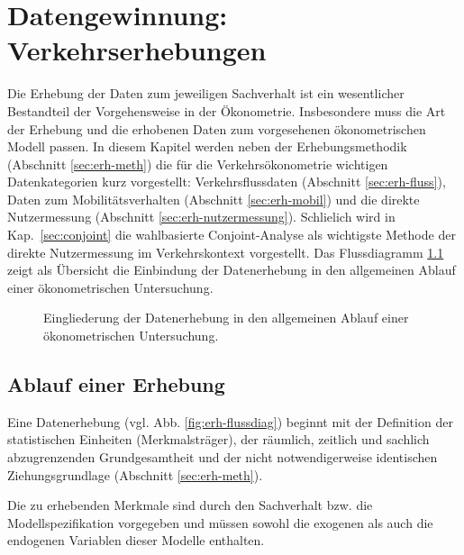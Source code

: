 


\chapter{\label{sec:erh}Datengewinnung: Verkehrserhebungen}

Die Erhebung der Daten zum jeweiligen Sachverhalt ist ein wesentlicher
Bestandteil der Vorgehensweise in der \"Okonometrie. Insbesondere muss die Art
der Erhebung und die erhobenen Daten zum vorgesehenen
\"okonometrischen Modell 
passen. In diesem Kapitel werden neben der Erhebungsmethodik 
(Abschnitt \ref{sec:erh-meth}) die f\"ur die Verkehrs\"okonometrie
wichtigen  Datenkategorien
kurz vorgestellt: Verkehrsflussdaten (Abschnitt
\ref{sec:erh-fluss}), Daten zum Mobilit\"atsverhalten
(Abschnitt \ref{sec:erh-mobil}) und die direkte Nutzermessung
(Abschnitt \ref{sec:erh-nutzermessung}). Schlie\3lich wird in
Kap.~\ref{sec:conjoint} die wahlbasierte Conjoint-Analyse als
wichtigste Methode der direkte Nutzermessung im Verkehrskontext vorgestellt. 
Das Flussdiagramm \ref{fig:flussdiag-erhebung} zeigt als \"Ubersicht
die Einbindung der 
Datenerhebung in den allgemeinen Ablauf einer \"okonometrischen
Untersuchung.

\begin{figure}
\caption{\label{fig:flussdiag-erhebung}Eingliederung der Datenerhebung
in den allgemeinen Ablauf einer \"okonometrischen
Untersuchung.
}
\end{figure}


\section{\label{sec:erh-ablauf}Ablauf einer Erhebung}

Eine Datenerhebung (vgl. Abb. \ref{fig:erh-flussdiag}) beginnt
 mit der Definition der statistischen
Einheiten (Merkmalstr\"ager), der r\"aumlich, zeitlich und sachlich
abzugrenzenden Grund\-gesamtheit und der nicht notwendigerweise
identischen Ziehungsgrundlage (Abschnitt \ref{sec:erh-meth}). 

Die zu
erhebenden Merkmale sind durch den Sachverhalt bzw. die
Modellspezifikation
 vorgegeben
und m\"ussen sowohl die exogenen als auch die endogenen Variablen
dieser Modelle enthalten. 

